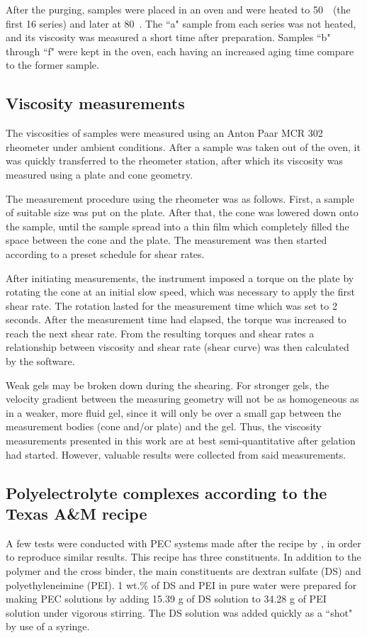 \documentclass[energies,article,submit,moreauthors,pdftex]{Definitions/mdpi}
\begin{document}
After the purging, samples were placed in an oven and were heated to 50~\celsius~(the first 16 series) and later at 80~\celsius. The ``a" sample from each series was not heated, and its viscosity was measured a short time after preparation. Samples ``b" through ``f" were kept in the oven, each having an increased aging time compare to the former sample. 

\subsection{Viscosity measurements}
The viscosities of samples were measured using an Anton Paar MCR 302 rheometer under ambient conditions. After a sample was taken out of the oven, it was quickly transferred to the rheometer station, after which its viscosity was measured using a plate and cone geometry.

The measurement procedure using the rheometer was as follows. First, a sample of suitable size was put on the plate. After that, the cone was lowered down onto the sample, until the sample spread into a thin film which completely filled the space between the cone and the plate. The measurement was then started according to a preset schedule for shear rates. 

After initiating measurements, the instrument imposed a torque on the plate by rotating the cone at an initial slow speed, which was necessary to apply the first shear rate. The rotation lasted for the measurement time which was set to 2 seconds. After the measurement time had elapsed, the torque was increased to reach the next shear rate. From the resulting torques and shear rates a relationship between viscosity and shear rate (shear curve) was then calculated by the software.

Weak gels may be broken down during the shearing. For stronger gels, the velocity gradient between the measuring geometry will not be as homogeneous as in a weaker, more fluid gel, since it will only be over a small gap between the measurement bodies (cone and/or plate) and the gel. Thus, the viscosity measurements presented in this work are at best semi-quantitative after gelation had started. However, valuable results were collected from said measurements.

\subsection{Polyelectrolyte complexes according to the Texas A\&M recipe \citep{Johnson2010}\label{sec:PEC}}
A few tests were conducted with PEC systems made after the recipe by \citet{Johnson2010}, in order to reproduce similar results. This recipe has three constituents. In addition to the polymer and the  cross binder, the main constituents are dextran sulfate (DS)  and polyethyleneimine (PEI).
1 wt.\% of DS and PEI in pure water were prepared for making PEC solutions by adding 15.39 g of DS solution to 34.28 g of PEI solution under vigorous stirring. The DS solution was added quickly as a ``shot" by use of a syringe.
\end{document}
